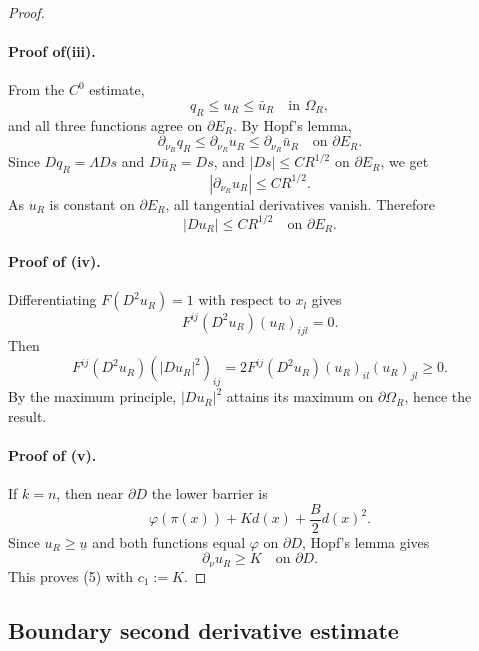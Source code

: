 \documentclass[reqno,a4paper]{amsart}
\numberwithin{equation}{section}
\begin{document}
\begin{proof}
		\paragraph{Proof of(iii).}
		From the $C^0$ estimate,
		\begin{equation}
			q_R \le u_R \le \bar{u}_R \quad \text{in } \Omega_R,
		\end{equation}
		and all three functions agree on $\partial E_R$. By Hopf's lemma,
		\begin{equation}
			\partial_{\nu_R} q_R \le \partial_{\nu_R} u_R \le \partial_{\nu_R} \bar{u}_R \quad \text{on } \partial E_R.
		\end{equation}
		Since $D q_R = \Lambda D s$ and $D \bar{u}_R = D s$, and $|Ds| \le C R^{1/2}$ on $\partial E_R$, we get
		\begin{equation}
			|\partial_{\nu_R} u_R| \le C R^{1/2}.
		\end{equation}
		As $u_R$ is constant on $\partial E_R$, all tangential derivatives vanish. Therefore
		\begin{equation}
			|Du_R| \le C R^{1/2} \quad \text{on } \partial E_R.
		\end{equation}
		
		\paragraph{Proof of (iv).}
		Differentiating $F(D^2 u_R) = 1$ with respect to $x_l$ gives
		\[
		F^{ij}(D^2 u_R) (u_R)_{ijl} = 0.
		\]
		Then
		\[
		F^{ij}(D^2 u_R) (|Du_R|^2)_{ij} = 2 F^{ij}(D^2 u_R) (u_R)_{il} (u_R)_{jl} \ge 0.
		\]
		By the maximum principle, $|Du_R|^2$ attains its maximum on $\partial \Omega_R$, hence the result.
		\paragraph{Proof of (v).}
		If $k=n$, then near $\partial D$ the lower barrier is
		\[
		\varphi(\pi(x))+Kd(x)+\frac{B}{2}d(x)^2.
		\]
		Since $u_R\ge \underline{u}$ and both functions equal $\varphi$ on $\partial D$, Hopf's lemma gives
		\begin{equation}
			\partial_\nu u_R \ge K \quad \text{on } \partial D.
		\end{equation}
		This proves (5) with $c_1:=K$.
	\end{proof}
	
	\subsection{Boundary second derivative estimate}
	
\end{document}
